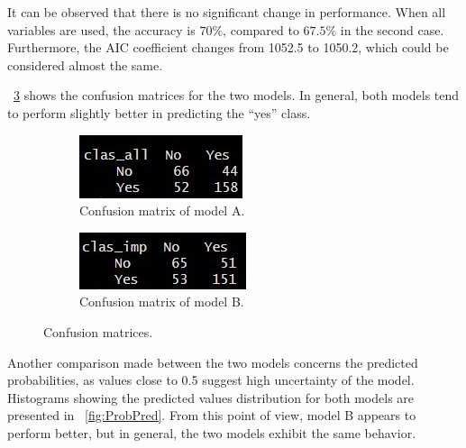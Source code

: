 It can be observed that there is no significant change in performance. When all variables are used, the accuracy is $70\%$, compared to $67.5\%$ in the second case. Furthermore, the AIC coefficient changes from 1052.5 to 1050.2, which could be considered almost the same. 

\Fig~\ref{fig:CM} shows the confusion matrices for the two models. In general, both models tend to perform slightly better in predicting the ``yes'' class.

\begin{figure}[h]
	\begin{subfigure}{.6\textwidth}
		\centering
		\includegraphics[width=0.7\linewidth]{ImageFiles/Classification/LogReg/log_reg_tt_all_pred_table}
		\caption{Confusion matrix of model A.}
		\label{fig:CMA}
	\end{subfigure}
	\begin{subfigure}{.6\textwidth}
		\centering
		\includegraphics[width=0.7\linewidth]{ImageFiles/Classification/LogReg/log_reg_tt_imp_pred_table}
		\caption{Confusion matrix of model B.}
		\label{fig:CMB}
	\end{subfigure}
	\caption{Confusion matrices.}
	\label{fig:CM}
\end{figure}

Another comparison made between the two models concerns the predicted probabilities, as values close to 0.5 suggest high uncertainty of the model. Histograms showing the predicted values distribution for both models are presented in \Fig~\ref{fig:ProbPred}. From this point of view, model B appears to perform better, but in general, the two models exhibit the same behavior.

